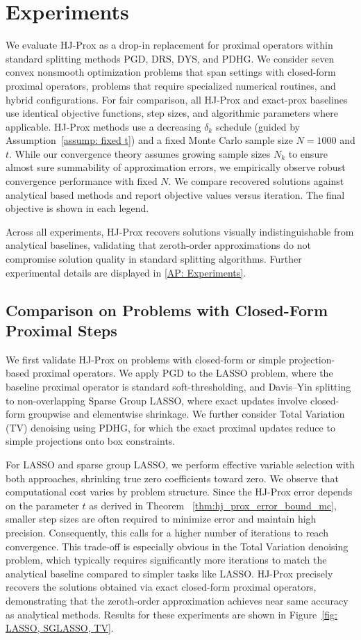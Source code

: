 \documentclass{article}
\theoremstyle{plain}
\theoremstyle{definition}
\theoremstyle{remark}
\begin{document}
\section{Experiments}

We evaluate HJ-Prox as a drop-in replacement for proximal operators within standard splitting methods PGD, DRS, DYS, and PDHG. We consider seven convex nonsmooth optimization problems that span settings with closed-form proximal operators, problems that require specialized numerical routines, and hybrid configurations. 
For fair comparison, all HJ-Prox and exact-prox baselines use identical objective functions, step sizes, and algorithmic parameters where applicable. HJ-Prox methods use a decreasing $\delta_k$ schedule (guided by Assumption~\ref{assump: fixed t}) and a fixed Monte Carlo sample size $N=1000$ and $t$. While our convergence theory assumes growing sample sizes $N_k$ to ensure almost sure summability of approximation errors, we empirically observe robust convergence performance with fixed $N$. We compare recovered solutions against analytical based methods and report objective values versus iteration. The final objective is shown in each legend. 

Across all experiments, HJ-Prox recovers solutions visually indistinguishable from analytical baselines, validating that zeroth-order approximations do not compromise solution quality in standard splitting algorithms. Further experimental details are displayed in \ref{AP: Experiments}.

\subsection{Comparison on Problems with Closed-Form Proximal Steps}
We first validate HJ-Prox on problems with closed-form or simple projection-based proximal operators. We apply PGD to the LASSO problem, where the baseline proximal operator is standard soft-thresholding, and Davis–Yin splitting to non-overlapping Sparse Group LASSO, where exact updates involve closed-form groupwise and elementwise shrinkage. We further consider Total Variation (TV) denoising using PDHG, for which the exact proximal updates reduce to simple projections onto box constraints. 

For LASSO and sparse group LASSO, we perform effective variable selection with both approaches, shrinking true zero coefficients toward zero. We observe that computational cost varies by problem structure. Since the HJ-Prox error depends on the parameter $t$ as derived in Theorem ~\ref{thm:hj_prox_error_bound_mc}, smaller step sizes are often required to minimize error and maintain high precision. Consequently, this calls for a higher number of iterations to reach convergence. This trade-off is especially obvious in the Total Variation denoising problem, which typically requires significantly more iterations to match the analytical baseline compared to simpler tasks like LASSO. HJ-Prox precisely recovers the solutions obtained via exact closed-form proximal operators, demonstrating that the zeroth-order approximation achieves near same accuracy as analytical methods. Results for these experiments are shown in Figure~\ref{fig: LASSO, SGLASSO, TV}.
\end{document}
